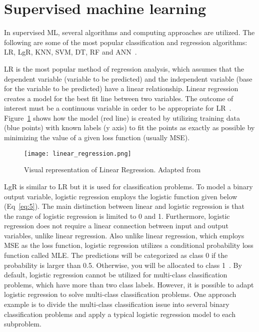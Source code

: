\section{Supervised machine learning}

In supervised \gls{ML}, several algorithms and computing approaches are utilized. The following are some of the most popular classification and regression algorithms: \gls{LR}, \gls{LgR}, \gls{KNN}, \gls{SVM}, \gls{DT}, \gls{RF} and \gls{ANN}~\cite{2020WhatIBM,Chugh2018TypesKnow}.

\gls{LR} is the most popular method of regression analysis, which assumes that the dependent variable (variable to be predicted) and the independent variable (base for the variable to be predicted) have a linear relationship. Linear regression creates a model for the best fit line between two variables. The outcome of interest must be a continuous variable in order to be appropriate for \gls{LR}~\cite{Worster2007UnderstandingAnalyses}. Figure~\ref{fig:linear_regression} shows how the model (red line) is created by utilizing training data (blue points) with known labels (y axis) to fit the points as exactly as possible by minimizing the value of a given loss function (usually \gls{MSE}).

\begin{figure}[htbp]
    \centering
    \texttt{[image: linear\_regression.png]}
    \caption{Visual representation of Linear Regression. Adapted from~\cite{Nasteski2017AnMethods}}
    \label{fig:linear_regression}
\end{figure}

\gls{LgR} is similar to \gls{LR} but it is used for classification problems. To model a binary output variable, logistic regression employs the logistic function given below (Eq~\ref{eq:5}). The main distinction between linear and logistic regression is that the range of logistic regression is limited to 0 and 1. Furthermore, logistic regression does not require a linear connection between input and output variables, unlike linear regression. Also unlike linear regression, which employs \gls{MSE} as the loss function, logistic regression utilizes a conditional probability loss function called \gls{MLE}. The predictions will be categorized as class 0 if the probability is larger than 0.5. Otherwise, you will be allocated to class 1~\cite{Belyadi2021SupervisedLearning}. By default, logistic regression cannot be utilized for multi-class classification problems, which have more than two class labels. However, it is possible to adapt logistic regression to solve  multi-class classification problems. One approach example is to divide the multi-class classification issue into several binary classification problems and apply a typical logistic regression model to each subproblem. 

